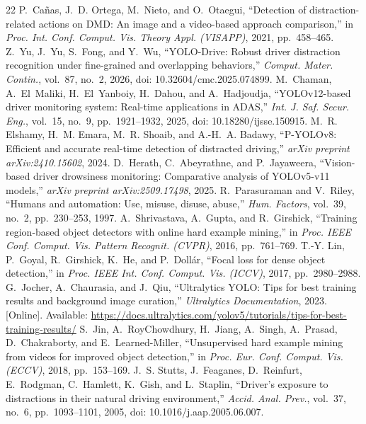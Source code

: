 \documentclass[conference]{IEEEtran}
\begin{document}
\begin{thebibliography}{22}
 P.~Ca\~{n}as, J.~D. Ortega, M.~Nieto, and O.~Otaegui, ``Detection of distraction-related actions on DMD: An image and a video-based approach comparison,'' in \emph{Proc. Int. Conf. Comput. Vis. Theory Appl. (VISAPP)}, 2021, pp.~458--465.
 Z.~Yu, J.~Yu, S.~Fong, and Y.~Wu, ``YOLO-Drive: Robust driver distraction recognition under fine-grained and overlapping behaviors,'' \emph{Comput. Mater. Contin.}, vol.~87, no.~2, 2026, doi: 10.32604/cmc.2025.074899.
 M.~Chaman, A.~El~Maliki, H.~El~Yanboiy, H.~Dahou, and A.~Hadjoudja, ``YOLOv12-based driver monitoring system: Real-time applications in ADAS,'' \emph{Int. J. Saf. Secur. Eng.}, vol.~15, no.~9, pp.~1921--1932, 2025, doi: 10.18280/ijsse.150915.
 M.~R. Elshamy, H.~M. Emara, M.~R. Shoaib, and A.-H.~A. Badawy, ``P-YOLOv8: Efficient and accurate real-time detection of distracted driving,'' \emph{arXiv preprint arXiv:2410.15602}, 2024.
 D.~Herath, C.~Abeyrathne, and P.~Jayaweera, ``Vision-based driver drowsiness monitoring: Comparative analysis of YOLOv5-v11 models,'' \emph{arXiv preprint arXiv:2509.17498}, 2025.
 R.~Parasuraman and V.~Riley, ``Humans and automation: Use, misuse, disuse, abuse,'' \emph{Hum. Factors}, vol.~39, no.~2, pp.~230--253, 1997.
 A.~Shrivastava, A.~Gupta, and R.~Girshick, ``Training region-based object detectors with online hard example mining,'' in \emph{Proc. IEEE Conf. Comput. Vis. Pattern Recognit. (CVPR)}, 2016, pp.~761--769.
 T.-Y. Lin, P.~Goyal, R.~Girshick, K.~He, and P.~Doll\'{a}r, ``Focal loss for dense object detection,'' in \emph{Proc. IEEE Int. Conf. Comput. Vis. (ICCV)}, 2017, pp.~2980--2988.
 G.~Jocher, A.~Chaurasia, and J.~Qiu, ``Ultralytics YOLO: Tips for best training results and background image curation,'' \emph{Ultralytics Documentation}, 2023. [Online]. Available: \url{https://docs.ultralytics.com/yolov5/tutorials/tips-for-best-training-results/}
 S.~Jin, A.~RoyChowdhury, H.~Jiang, A.~Singh, A.~Prasad, D.~Chakraborty, and E.~Learned-Miller, ``Unsupervised hard example mining from videos for improved object detection,'' in \emph{Proc. Eur. Conf. Comput. Vis. (ECCV)}, 2018, pp.~153--169.
 J.~S. Stutts, J.~Feaganes, D.~Reinfurt, E.~Rodgman, C.~Hamlett, K.~Gish, and L.~Staplin, ``Driver's exposure to distractions in their natural driving environment,'' \emph{Accid. Anal. Prev.}, vol.~37, no.~6, pp.~1093--1101, 2005, doi: 10.1016/j.aap.2005.06.007.

\end{thebibliography}
\end{document}

